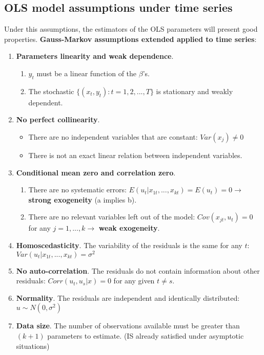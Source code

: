 \documentclass[10pt, a4paper, landscape]{extarticle}
\begin{document}
\begin{multicols}{3}
	\subsection*{OLS model assumptions under time series}
		Under this assumptions, the estimators of the OLS parameters will present good properties. \textbf{Gauss-Markov assumptions extended applied to time series}:
		\begin{enumerate}[leftmargin=*, label=ts\arabic*.]
			\item \textbf{Parameters linearity and weak dependence}.
			\begin{enumerate}[leftmargin=*, label=\alph*.]
				\item $y_t$ must be a linear function of the $\beta$'s.
				\item The stochastic $\lbrace(x_t, y_t): t = 1, 2, ..., T\rbrace$ is stationary and weakly dependent.
			\end{enumerate} 
			\item \textbf{No perfect collinearity}.
			\begin{itemize}[leftmargin=*]
				\item There are no independent variables that are constant: $Var(x_j) \neq 0$
				\item There is not an exact linear relation between independent variables.
			\end{itemize}
			\item \textbf{Conditional mean zero and correlation zero}.
			\begin{enumerate}[leftmargin=*, label=\alph*.]
				\item There are no systematic errors: $E(u_t | x_{1t}, ..., x_{kt}) = E(u_t) = 0 \rightarrow$ \textbf{strong exogeneity} (a implies b).
				\item There are no relevant variables left out of the model: $Cov(x_{jt} , u_t) = 0$ for any $j = 1, ..., k \rightarrow$ \textbf{weak exogeneity}.
			\end{enumerate}
			\item \textbf{Homoscedasticity}. The variability of the residuals is the same for any $t$: $Var(u_t | x_{1t}, ..., x_{kt}) = \sigma^2$
			\item \textbf{No auto-correlation}. The residuals do not contain information about other residuals: $Corr(u_t, u_s | x) = 0$ for any given $t \neq s$.
			\item \textbf{Normality}. The residuals are independent and identically distributed: $u \sim N(0,\sigma^2)$
			\item \textbf{Data size}. The number of observations available must be greater than $(k + 1)$ parameters to estimate. (IS already satisfied under asymptotic situations)
		\end{enumerate}	

\end{multicols}
\end{document}
